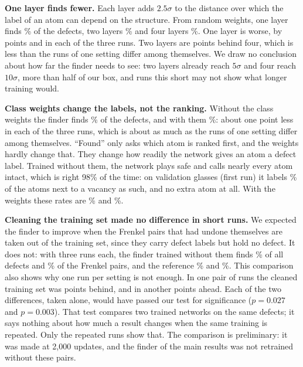 \textbf{One layer finds fewer.} Each layer adds $2.5\sigma$ to the distance over which the label of an atom can depend on the structure. From random weights, one layer finds \% of the defects, two layers \% and four layers \%. One layer is worse, by  points and in each of the three runs. Two layers are  points behind four, which is less than the runs of one setting differ among themselves. We draw no conclusion about how far the finder needs to see: two layers already reach $5\sigma$ and four reach $10\sigma$, more than half of our box, and runs this short may not show what longer training would.

\textbf{Class weights change the labels, not the ranking.} Without the class weights the finder finds \% of the defects, and with them \%: about one point less in each of the three runs, which is about as much as the runs of one setting differ among themselves. ``Found'' only asks which atom is ranked first, and the weights hardly change that. They change how readily the network gives an atom a defect label. Trained without them, the network plays safe and calls nearly every atom intact, which is right 98\% of the time: on validation glasses (first run) it labels \% of the atoms next to a vacancy as such, and no extra atom at all. With the weights these rates are \% and \%.

\textbf{Cleaning the training set made no difference in short runs.} We expected the finder to improve when the Frenkel pairs that had undone themselves are taken out of the training set, since they carry defect labels but hold no defect. It does not: with three runs each, the finder trained without them finds \% of all defects and \% of the Frenkel pairs, and the reference \% and \%. This comparison also shows why one run per setting is not enough. In one pair of runs the cleaned training set was  points behind, and in another  points ahead. Each of the two differences, taken alone, would have passed our test for significance ($p=0.027$ and $p=0.003$). That test compares two trained networks on the same defects; it says nothing about how much a result changes when the same training is repeated. Only the repeated runs show that. The comparison is preliminary: it was made at 2,000 updates, and the finder of the main results was not retrained without these pairs.
